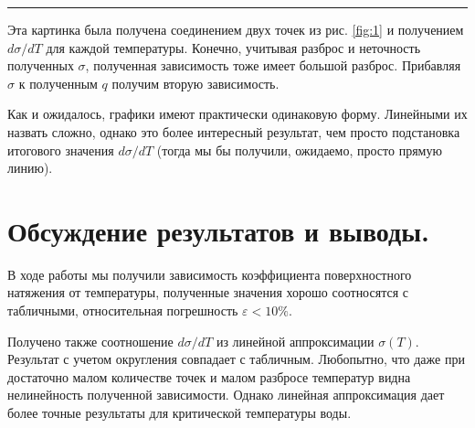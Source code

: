 \documentclass[a4paper,12pt]{report}
\begin{document}
    \hrule

    \begin{multicols}{2}
        Эта картинка была получена соединением двух точек из рис. \ref{fig:1} и получением $d\sigma/dT$ для каждой температуры. Конечно, учитывая разброс и неточность полученных $\sigma$, полученная зависимость тоже имеет большой разброс. Прибавляя $\sigma$ к полученным $q$ получим вторую зависимость.

        Как и ожидалось, графики имеют практически одинаковую форму. Линейными их назвать сложно, однако это более интересный результат, чем просто подстановка итогового значения $d\sigma/dT$ (тогда мы бы получили, ожидаемо, просто прямую линию).

        \newcolumn

        \section{Обсуждение результатов и выводы.}

        В ходе работы мы получили зависимость коэффициента поверхностного натяжения от температуры, полученные значения хорошо соотносятся с табличными, относительная погрешность $\varepsilon<10\%$.

        Получено также соотношение $d\sigma/dT$ из линейной аппроксимации $\sigma(T)$. Результат с учетом округления совпадает с табличным. Любопытно, что даже при достаточно малом количестве точек и малом разбросе температур видна нелинейность полученной зависимости. Однако линейная аппроксимация дает более точные результаты для критической температуры воды.


    \end{multicols}
    \newpage
\end{document}
